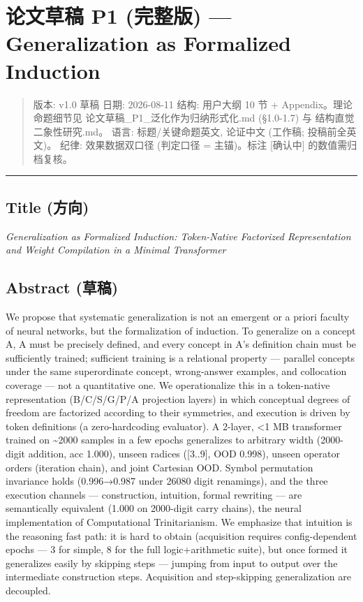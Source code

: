 \documentclass[
]{article}
\author{}
\date{}
\begin{document}
\section{论文草稿 P1 (完整版) --- Generalization as Formalized
Induction}\label{ux8bbaux6587ux8349ux7a3f-p1-ux5b8cux6574ux7248-generalization-as-formalized-induction}

\begin{quote}
版本: v1.0 草稿 \textbar{} 日期: 2026-08-11 结构: 用户大纲 10 节 +
Appendix。理论命题细节见 论文草稿\_P1\_泛化作为归纳形式化.md (§1.0-1.7)
与 结构直觉二象性研究.md。 语言: 标题/关键命题英文, 论证中文 (工作稿;
投稿前全英文)。 纪律: 效果数据双口径 (判定口径 = 主锚)。标注
{[}确认中{]} 的数值需归档复核。
\end{quote}

\begin{center}\rule{0.5\linewidth}{0.5pt}\end{center}

\subsection{Title (方向)}\label{title-ux65b9ux5411}

\emph{Generalization as Formalized Induction: Token-Native Factorized
Representation and Weight Compilation in a Minimal Transformer}

\subsection{Abstract (草稿)}\label{abstract-ux8349ux7a3f}

We propose that systematic generalization is not an emergent or a priori
faculty of neural networks, but the formalization of induction. To
generalize on a concept A, A must be precisely defined, and every
concept in A's definition chain must be sufficiently trained; sufficient
training is a relational property --- parallel concepts under the same
superordinate concept, wrong-answer examples, and collocation coverage
--- not a quantitative one. We operationalize this in a token-native
representation (B/C/S/G/P/A projection layers) in which conceptual
degrees of freedom are factorized according to their symmetries, and
execution is driven by token definitions (a zero-hardcoding evaluator).
A 2-layer, \textless1 MB transformer trained on \textasciitilde2000
samples in a few epochs generalizes to arbitrary width (2000-digit
addition, acc 1.000), unseen radices ({[}3..9{]}, OOD 0.998), unseen
operator orders (iteration chain), and joint Cartesian OOD. Symbol
permutation invariance holds (0.996→0.987 under 26080 digit renamings),
and the three execution channels --- construction, intuition, formal
rewriting --- are semantically equivalent (1.000 on 2000-digit carry
chains), the neural implementation of Computational Trinitarianism. We
emphasize that intuition is the reasoning fast path: it is hard to
obtain (acquisition requires config-dependent epochs --- 3 for simple, 8
for the full logic+arithmetic suite), but once formed it generalizes
easily by skipping steps --- jumping from input to output over the
intermediate construction steps. Acquisition and step-skipping
generalization are decoupled.
\end{document}
